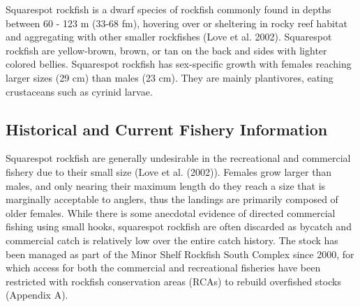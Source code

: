 \documentclass[11pt,
  english,
  a4paper,
]{article}
\begin{document}
\leavevmode\tagmcend\tagstructend


Squarespot rockfish is a dwarf species of rockfish commonly found in depths between 60 - 123 m (33-68 fm), hovering over or sheltering in rocky reef habitat and aggregating with other smaller rockfishes {(Love et al. 2002)\leavevmode\tagmcend\tagstructend}. Squarespot rockfish are yellow-brown, brown, or tan on the back and sides with lighter colored bellies. Squarespot rockfish has sex-specific growth with females reaching larger sizes (29 cm) than males (23 cm). They are mainly plantivores, eating crustaceans such as cyrinid larvae.

\leavevmode\tagmcend\tagstructend\par


\hypertarget{historical-and-current-fishery-information}{%
\subsection{Historical and Current Fishery Information}\label{historical-and-current-fishery-information}}

\leavevmode\tagmcend\tagstructend


Squarespot rockfish are generally undesirable in the recreational and commercial fishery due to their small size ({Love et al. (2002)\leavevmode\tagmcend\tagstructend}). Females grow larger than males, and only nearing their maximum length do they reach a size that is marginally acceptable to anglers, thus the landings are primarily composed of older females. While there is some anecdotal evidence of directed commercial fishing using small hooks, squarespot rockfish are often discarded as bycatch and commercial catch is relatively low over the entire catch history. The stock has been managed as part of the Minor Shelf Rockfish South Complex since 2000, for which access for both the commercial and recreational fisheries have been restricted with rockfish conservation areas (RCAs) to rebuild overfished stocks (Appendix A).

\leavevmode\tagmcend\tagstructend\par

\end{document}

